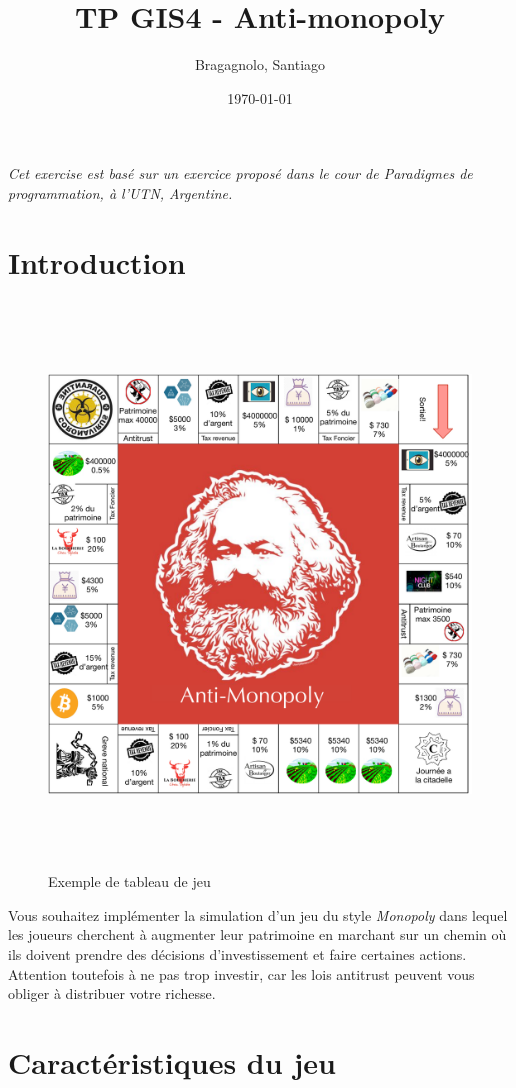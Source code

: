 \documentclass[12pt]{article}
\author{
        Bragagnolo, Santiago
}
\title{TP GIS4 - Anti-monopoly}
\date{\today}
\begin{document}
\maketitle
\emph{Cet exercise est basé sur un exercice proposé dans le cour de Paradigmes de programmation, à l'UTN, Argentine.}

\section{Introduction}

\begin{figure}
\includegraphics[width=15cm,height=15cm,keepaspectratio]{figures/board.pdf}
\caption{Exemple de tableau de jeu}
\end{figure}

	Vous souhaitez implémenter la simulation d'un jeu du style \emph{Monopoly} dans lequel les joueurs cherchent
à augmenter leur patrimoine en marchant sur un chemin où ils doivent prendre des décisions 
d'investissement et faire certaines actions. Attention toutefois à ne pas trop investir, car 
les lois antitrust peuvent vous obliger à distribuer votre richesse.


\section{Caractéristiques du jeu}
\end{document}
